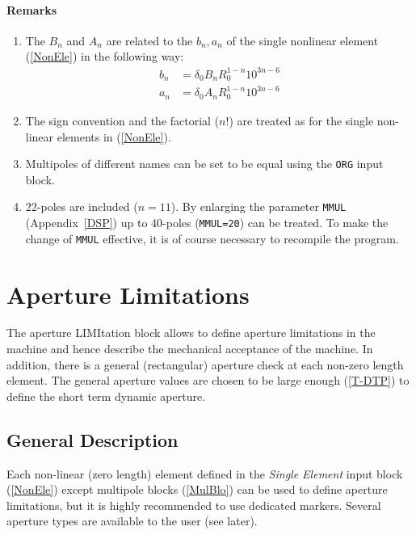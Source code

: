 \paragraph{Remarks}
\begin{enumerate}
    \item The $B_{n}$ and $A_{n}$ are related to the $b_{n}, a_{n}$ of the single nonlinear element (\ref{NonEle}) in the following way:
        \begin{align*}
            b_{n} &= \delta_{0} B_{n} R_{0}^{1-n} 10^{3n-6} \\
            a_{n} &= \delta_{0} A_{n} R_{0}^{1-n} 10^{3n-6}
        \end{align*}
    \item The sign convention and the factorial ($n$!) are treated as for the single non-linear elements in (\ref{NonEle}).
    \item Multipoles of different names can be set to be equal using the \texttt{ORG} input block.
    \item 22-poles are included ($n=11$). By enlarging the parameter \texttt{MMUL} (Appendix~\ref{DSP}) up to 40-poles (\texttt{MMUL=20}) can be treated. To make the change of \texttt{MMUL} effective, it is of course necessary to recompile the program.
\end{enumerate}

\section{Aperture Limitations} \label{ApeLim}

The aperture LIMItation block allows to define aperture limitations in the machine
and hence describe the mechanical acceptance of the machine.
In addition, there is a general (rectangular) aperture check at each non-zero
length element. The general aperture values are chosen to be large enough (\ref{T-DTP})
to define the short term dynamic aperture.

\subsection{General Description} \label{ApeLim:GenDesc}
Each non-linear (zero length) element defined in the \textit{Single Element} input block
(\ref{NonEle}) except multipole blocks (\ref{MulBlo}) can be used to define aperture limitations,
but it is highly recommended to use dedicated markers. Several aperture types are available to
the user (see later).

